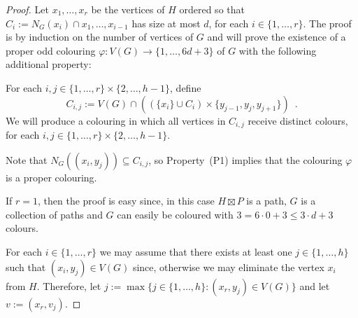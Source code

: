 \documentclass{patmorin}
\begin{document}
\begin{proof}
  Let $x_1,\ldots,x_r$ be the vertices of $H$ ordered so that  $C_i:=N_G(x_i)\cap x_1,\ldots,x_{i-1}$ has size at most $d$, for each $i\in\{1,\ldots,r\}$.  The proof is by induction on the number of vertices of $G$ and will prove the existence of a proper odd colouring $\varphi:V(G)\to\{1,\ldots,6d+3\}$ of $G$ with the following additional property: 
  \begin{compactenum}[(P1)]
    \item For each $i,j\in\{1,\ldots,r\}\times \{2,\ldots,h-1\}$, define
    \[
      C_{i,j}:=V(G)\cap ((\{x_i\}\cup C_i)\times\{y_{j-1}, y_{j},y_{j+1}\})
      \enspace . 
    \] 
    We will produce a colouring in which all vertices in $C_{i,j}$ receive distinct colours, for each $i,j\in\{1,\ldots,r\}\times\{2,\ldots,h-1\}$.
  \end{compactenum}
  Note that $N_G((x_i,y_j)) \subseteq C_{i,j}$, so Property~(P1) implies that the colouring $\varphi$ is a proper colouring.
  
  If $r=1$, then the proof is easy since, in this case $H\boxtimes P$ is a path, $G$ is a collection of paths and $G$ can easily be coloured with $3=6\cdot 0+3\le 3\cdot d+3$ colours.
  
  For each $i\in\{1,\ldots,r\}$ we may assume that there exists at least one $j\in\{1,\ldots,h\}$ such that $(x_i,y_j)\in V(G)$ since, otherwise we may eliminate the vertex $x_i$ from $H$.  Therefore, let $j:=\max\{j\in\{1,\ldots,h\}:(x_r,y_j)\in V(G)\}$ and let $v:=(x_r,v_j)$.
  

\end{proof}
\end{document}
